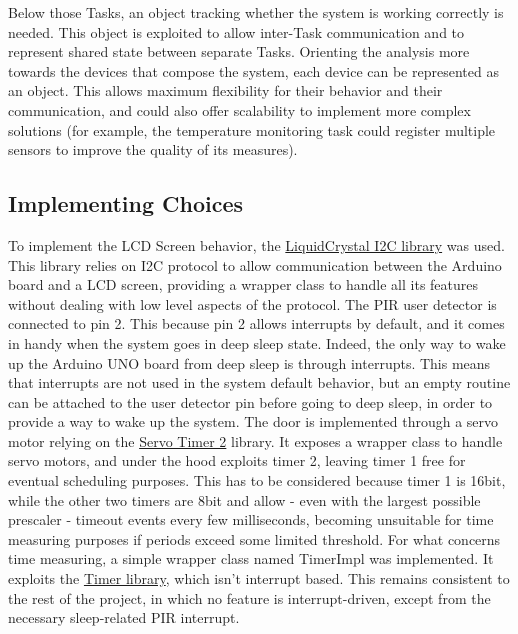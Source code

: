 \documentclass[a4paper,12pt]{report}
\begin{document}
	\newline Below those Tasks, an object tracking whether the system is working correctly is needed. This object is exploited to allow inter-Task communication and to represent shared state between separate Tasks.
	\newline Orienting the analysis more towards the devices that compose the system, each device can be represented as an object. This allows maximum flexibility for their behavior and their communication, and could also offer scalability to implement more complex solutions (for example, the temperature monitoring task could register multiple sensors to improve the quality of its measures).
	
	\subsection{Implementing Choices}
	To implement the LCD Screen behavior, the \href{https://docs.arduino.cc/libraries/liquidcrystal-i2c/}{LiquidCrystal I2C library} was used. This library relies on I2C protocol to allow communication between the Arduino board and a LCD screen, providing a wrapper class to handle all its features without dealing with low level aspects of the protocol.
	\newline The PIR user detector is connected to pin 2. This because pin 2 allows interrupts by default, and it comes in handy when the system goes in deep sleep state. Indeed, the only way to wake up the Arduino UNO board from deep sleep is through interrupts. This means that interrupts are not used in the system default behavior, but an empty routine can be attached to the user detector pin before going to deep sleep, in order to provide a way to wake up the system.
	\newline The door is implemented through a servo motor relying on the \href{https://github.com/nabontra/ServoTimer2}{Servo Timer 2} library. It exposes a wrapper class to handle servo motors, and under the hood exploits timer 2, leaving timer 1 free for eventual scheduling purposes. This has to be considered because timer 1 is 16bit, while the other two timers are 8bit and allow - even with the largest possible prescaler - timeout events every few milliseconds, becoming unsuitable for time measuring purposes if periods exceed some limited threshold.
	\newline For what concerns time measuring, a simple wrapper class named TimerImpl was implemented. It exploits the \href{https://github.com/sstaub/Timer}{Timer library}, which isn't interrupt based. This remains consistent to the rest of the project, in which no feature is interrupt-driven, except from the necessary sleep-related PIR interrupt.
\end{document}
